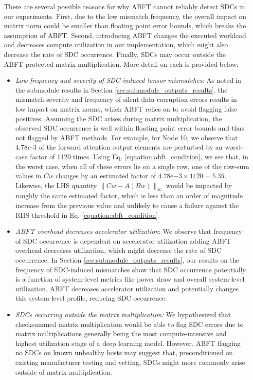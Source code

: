 There are several possible reasons for why ABFT cannot reliably detect SDCs in our experiments. First, due to the low mismatch frequency, the overall impact on matrix norm could be smaller than floating point error bounds, which breaks the assumption of ABFT. Second, introducing ABFT changes the executed workload and decreases compute utilization in our implementation, which might also decrease the rate of SDC occurrence. Finally, SDCs may occur outside the ABFT-protected matrix multiplication. More detail on each is provided below:
\begin{itemize}
    \item \emph{Low frequency and severity of SDC-induced tensor mismatches:} As noted in the submodule results in Section \ref{sec:submodule_outputs_results}, the mismatch severity and frequency of silent data corruption errors results in low impact on matrix norms, which ABFT relies on to avoid flagging false positives. Assuming the SDC arises during matrix multiplication, the observed SDC occurrence is well within floating point error bounds and thus not flagged by ABFT methods. For example, for Node 10, we observe that 4.78$e$-3 of the forward attention output elements are perturbed by an worst-case factor of 1120 times. Using Eq. \ref{equation:abft_condition}, we see that, in the worst case, when all of these errors lie on a single row, one of the row-sum values in $Cw$ changes by an estimated factor of $4.78$e$-3 \times 1120 = 5.35$. Likewise, the LHS quantity $\|Cw - A(Bw)\|_\infty$ would be impacted by roughly the same estimated factor, which is less than an order of magnitude increase from the previous value and unlikely to cause a failure against the RHS threshold in Eq. \ref{equation:abft_condition}.
    \item \emph{ABFT overhead decreases accelerator utilization}: We observe that frequency of SDC occurrence is dependent on accelerator utilization adding ABFT overhead decreases utilization, which might decrease the rate of SDC occurrence. In Section \ref{sec:submodule_outputs_results}, our results on the frequency of SDC-induced mismatches show that SDC occurrence potentially is a function of system-level metrics like power draw and overall system-level utilization. ABFT decreases accelerator utilization and potentially changes this system-level profile, reducing SDC occurrence.
    \item \emph{SDCs occurring outside the matrix multiplication:} We hypothesized that checksummed matrix multiplication would be able to flag SDC errors due to matrix multiplications generally being the most compute-intensive and  highest utilization stage of a deep learning model. However, ABFT flagging no SDCs on known unhealthy hosts may suggest that, preconditioned on existing manufacturer testing and vetting, SDCs might more commonly arise outside of matrix multiplication.
\end{itemize}

